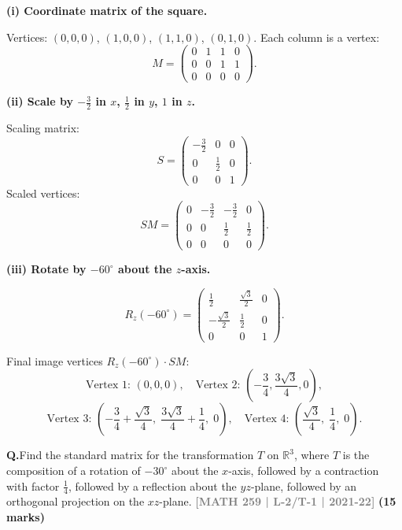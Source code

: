 \documentclass[12pt,a3paper]{article}
\newcommand{\yr}[1]{\hfill\textcolor{gray}{\small\textbf{[#1]}}}
\newcommand{\mk}[1]{\textcolor{orange!70!black}{\small\textbf{(#1 marks)}}}
\newcounter{qnum}
\newcommand{\Q}[1]{%
  \needspace{4\baselineskip}
  \refstepcounter{qnum}
  \vspace{6pt}
  \noindent\textbf{Q\theqnum.}\enspace #1\par
}
\begin{document}
\begin{tcolorbox}[enhanced,breakable,
  colback=cF!4,colframe=cF,boxrule=0.8pt,arc=5pt,
  title={\textbf{Answer --- Square: Coordinate Matrix, Scaling, Rotation by $-60^\circ$ about $z$}},
  fonttitle=\bfseries\color{white},colbacktitle=cF]

\textbf{(i) Coordinate matrix of the square.}

Vertices: $(0,0,0)$, $(1,0,0)$, $(1,1,0)$, $(0,1,0)$. Each column is a vertex:
\[
M=\begin{pmatrix}0&1&1&0\\0&0&1&1\\0&0&0&0\end{pmatrix}.
\]

\textbf{(ii) Scale by $-\tfrac{3}{2}$ in $x$, $\tfrac{1}{2}$ in $y$, $1$ in $z$.}

Scaling matrix:
\[
S=\begin{pmatrix}-\frac{3}{2}&0&0\\0&\frac{1}{2}&0\\0&0&1\end{pmatrix}.
\]
Scaled vertices:
\[
SM=\begin{pmatrix}0&-\frac{3}{2}&-\frac{3}{2}&0\\0&0&\frac{1}{2}&\frac{1}{2}\\0&0&0&0\end{pmatrix}.
\]

\textbf{(iii) Rotate by $-60^\circ$ about the $z$-axis.}

\[
R_z(-60^\circ)=\begin{pmatrix}\frac{1}{2}&\frac{\sqrt{3}}{2}&0\\-\frac{\sqrt{3}}{2}&\frac{1}{2}&0\\0&0&1\end{pmatrix}.
\]

Final image vertices $R_z(-60^\circ)\cdot SM$:
\[
\text{Vertex 1: }(0,0,0),\quad
\text{Vertex 2: }\left(-\frac{3}{4},\frac{3\sqrt{3}}{4},0\right),
\]
\[
\text{Vertex 3: }\left(-\frac{3}{4}+\frac{\sqrt{3}}{4},\;\frac{3\sqrt{3}}{4}+\frac{1}{4},\;0\right),\quad
\text{Vertex 4: }\left(\frac{\sqrt{3}}{4},\;\frac{1}{4},\;0\right).
\]

\end{tcolorbox}

\Q{Find the standard matrix for the transformation $T$ on $\mathbb{R}^3$, where $T$ is the composition of a rotation of $-30^\circ$ about the $x$-axis, followed by a contraction with factor $\frac{1}{4}$, followed by a reflection about the $yz$-plane, followed by an orthogonal projection on the $xz$-plane.
\yr{MATH 259 | L-2/T-1 | 2021-22} \mk{15}}
\end{document}
